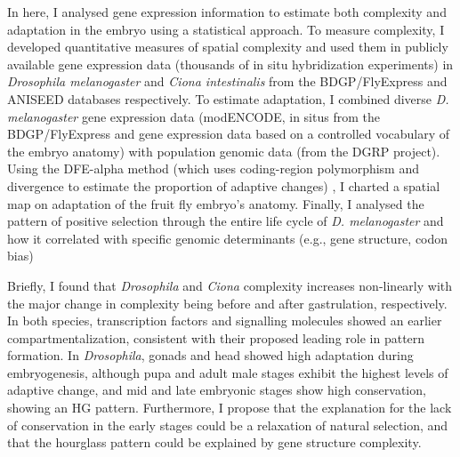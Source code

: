 \hfill\break 
In here, I analysed gene expression information to estimate both complexity and adaptation in the embryo using a statistical approach.
%
To measure complexity, I developed quantitative measures of spatial complexity and used them in publicly available gene expression data (thousands of in situ hybridization experiments) %
 in \textit{Drosophila melanogaster} and \textit{Ciona intestinalis} from the BDGP/FlyExpress and ANISEED databases respectively.
%
To estimate adaptation, I combined diverse \textit{D. melanogaster} gene expression data (modENCODE,  in situs from the BDGP/FlyExpress and gene expression data based on a controlled vocabulary of the embryo anatomy) with population genomic data (from the DGRP project). Using the DFE-alpha method 
(which uses coding-region polymorphism and divergence to estimate the proportion of adaptive changes)
, I charted a spatial map on adaptation of the fruit fly embryo's anatomy. 
Finally, I analysed the pattern of positive selection through the entire life cycle of \textit{D. melanogaster} and how it correlated with specific genomic determinants (e.g., gene structure, codon bias)

\hfill\break 
Briefly, I found that \textit{Drosophila} and \textit{Ciona} complexity increases non-linearly with the major change in complexity being before and after gastrulation, respectively. 
In both species, transcription factors and signalling molecules showed an earlier compartmentalization, consistent with their proposed leading role in pattern formation.
%
In \textit{Drosophila}, gonads and head showed high adaptation during embryogenesis, although pupa and adult male stages exhibit the highest levels of adaptive change, and mid and late embryonic stages show high conservation, showing an HG pattern.
Furthermore, I propose that the explanation for the lack of conservation in the early stages could be a relaxation of natural selection, and that the hourglass pattern could be explained by gene structure complexity.